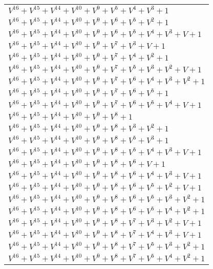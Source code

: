 \documentclass[12pt]{article}
\begin{document}
\begin{adjustwidth}{-4cm}{}
\begin{center}
\begin{longtable}{|l|}
$V^{16}  +V^{15}  +V^{14}  +V^{10}  +V^{9}  +V^{5}  +V^{4}  +V^{3}  + 1$ \\
$V^{16}  +V^{15}  +V^{14}  +V^{10}  +V^{9}  +V^{6}  +V^{5}  +V^{2}  + 1$ \\
$V^{16}  +V^{15}  +V^{14}  +V^{10}  +V^{9}  +V^{6}  +V^{5}  +V^{4}  +V^{3}  + V + 1$ \\
$V^{16}  +V^{15}  +V^{14}  +V^{10}  +V^{9}  +V^{7}  +V^{3}  + V + 1$ \\
$V^{16}  +V^{15}  +V^{14}  +V^{10}  +V^{9}  +V^{7}  +V^{4}  +V^{2}  + 1$ \\
$V^{16}  +V^{15}  +V^{14}  +V^{10}  +V^{9}  +V^{7}  +V^{5}  +V^{3}  +V^{2}  + V + 1$ \\
$V^{16}  +V^{15}  +V^{14}  +V^{10}  +V^{9}  +V^{7}  +V^{6}  +V^{4}  +V^{3}  +V^{2}  + 1$ \\
$V^{16}  +V^{15}  +V^{14}  +V^{10}  +V^{9}  +V^{7}  +V^{6}  +V^{5}  + 1$ \\
$V^{16}  +V^{15}  +V^{14}  +V^{10}  +V^{9}  +V^{7}  +V^{6}  +V^{5}  +V^{4}  + V + 1$ \\
$V^{16}  +V^{15}  +V^{14}  +V^{10}  +V^{9}  +V^{8}  + 1$ \\
$V^{16}  +V^{15}  +V^{14}  +V^{10}  +V^{9}  +V^{8}  +V^{3}  +V^{2}  + 1$ \\
$V^{16}  +V^{15}  +V^{14}  +V^{10}  +V^{9}  +V^{8}  +V^{5}  +V^{3}  + 1$ \\
$V^{16}  +V^{15}  +V^{14}  +V^{10}  +V^{9}  +V^{8}  +V^{5}  +V^{4}  +V^{3}  + V + 1$ \\
$V^{16}  +V^{15}  +V^{14}  +V^{10}  +V^{9}  +V^{8}  +V^{6}  + V + 1$ \\
$V^{16}  +V^{15}  +V^{14}  +V^{10}  +V^{9}  +V^{8}  +V^{6}  +V^{4}  +V^{3}  + V + 1$ \\
$V^{16}  +V^{15}  +V^{14}  +V^{10}  +V^{9}  +V^{8}  +V^{6}  +V^{5}  +V^{2}  + V + 1$ \\
$V^{16}  +V^{15}  +V^{14}  +V^{10}  +V^{9}  +V^{8}  +V^{6}  +V^{5}  +V^{3}  +V^{2}  + 1$ \\
$V^{16}  +V^{15}  +V^{14}  +V^{10}  +V^{9}  +V^{8}  +V^{6}  +V^{5}  +V^{4}  +V^{2}  + 1$ \\
$V^{16}  +V^{15}  +V^{14}  +V^{10}  +V^{9}  +V^{8}  +V^{7}  +V^{3}  +V^{2}  + V + 1$ \\
$V^{16}  +V^{15}  +V^{14}  +V^{10}  +V^{9}  +V^{8}  +V^{7}  +V^{4}  +V^{3}  + V + 1$ \\
$V^{16}  +V^{15}  +V^{14}  +V^{10}  +V^{9}  +V^{8}  +V^{7}  +V^{5}  +V^{3}  +V^{2}  + 1$ \\
$V^{16}  +V^{15}  +V^{14}  +V^{10}  +V^{9}  +V^{8}  +V^{7}  +V^{5}  +V^{4}  +V^{2}  + 1$ \\

\end{longtable}
\end{center}
\end{adjustwidth}
\end{document}
